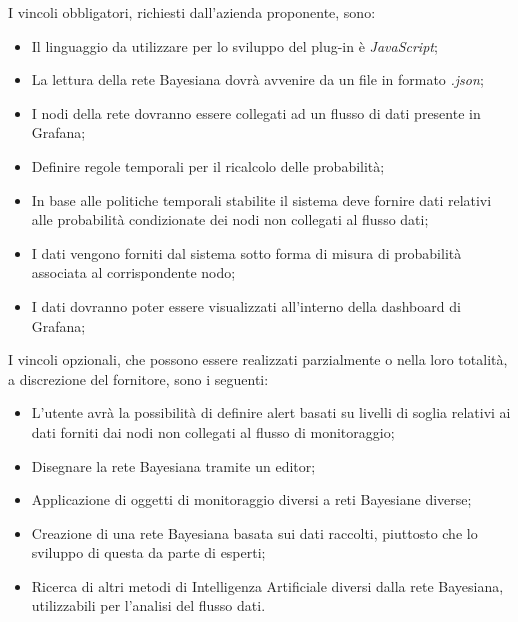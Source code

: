 I vincoli obbligatori, richiesti dall'azienda proponente, sono:
\begin{itemize}
	\item Il linguaggio da utilizzare per lo sviluppo del plug-in è \textit{JavaScript};
	\item La lettura della rete Bayesiana dovrà avvenire da un file in formato \textit{.json};
	\item I nodi della rete dovranno essere collegati ad un flusso di dati presente in Grafana;
	\item Definire regole temporali per il ricalcolo delle probabilità;
	\item In base alle politiche temporali stabilite il sistema deve fornire dati relativi alle probabilità condizionate dei nodi non collegati al flusso dati;
	\item I dati vengono forniti dal sistema sotto forma di misura di probabilità associata al corrispondente nodo; 
	\item I dati dovranno poter essere visualizzati all'interno della dashboard di Grafana;
\end{itemize}

I vincoli opzionali, che possono essere realizzati parzialmente o nella loro totalità, a discrezione del fornitore, sono i seguenti: 
\begin{itemize}
\item L'utente avrà la possibilità di definire alert basati su livelli di soglia relativi ai dati forniti dai nodi non collegati al flusso di monitoraggio;
\item Disegnare la rete Bayesiana tramite un editor; 
\item Applicazione di oggetti di monitoraggio diversi a reti Bayesiane diverse;
\item Creazione di una rete Bayesiana basata sui dati raccolti, piuttosto che lo sviluppo di questa da parte di esperti; 
\item Ricerca di altri metodi di Intelligenza Artificiale diversi dalla rete Bayesiana, utilizzabili per l'analisi del flusso dati. 
\end{itemize}
